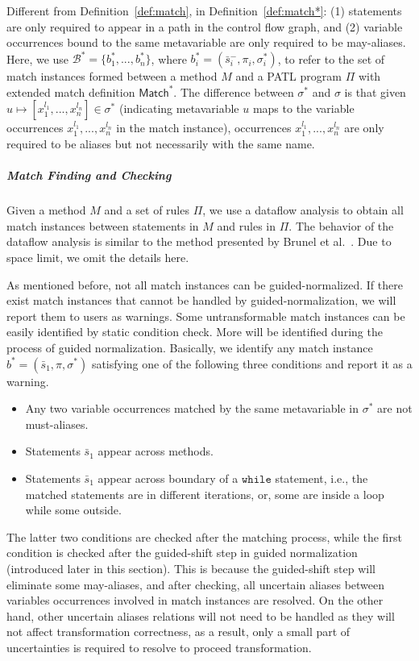 \documentclass[a4paper, USenglish]{lipics-v2016}
\newcommand{\PATL}{PATL\xspace}
\theoremstyle{plain}
\begin{document}
Different from Definition~\ref{def:match}, in Definition~\ref{def:match*}: (1) statements are only required to appear in a path in the control flow graph, and (2) variable occurrences bound to the same metavariable are only required to be may-aliases. Here, we use $\mathcal{B}^*=\{b_1^*,...,b_n^*\}$, where
$b_i^*=(\bar{s}^-_i,\pi_i,\sigma_i^*)$, to refer to the set of match
instances formed between a method $M$ and a \PATL program $\Pi$ with
extended match definition $\mathsf{Match^*}$. The difference between
$\sigma^*$ and $\sigma$ is that given
$u\mapsto[x_1^{l_1},...,x_n^{l_n}]\in\sigma^*$ (indicating
metavariable $u$ maps to the variable occurrences
$x_1^{l_1},...,x_n^{l_n}$ in the match instance), occurrences
$x_1^{l_1},...,x_n^{l_n}$ are only required to be aliases but not
necessarily with the same name.

\subparagraph*{Match Finding and Checking}
Given a method $M$ and a set of rules $\Pi$, we use a dataflow
analysis to obtain all match instances between statements in $M$ and
rules in $\Pi$. The behavior of the dataflow analysis is similar to
the method presented by Brunel et
al.~\cite{DBLP:conf/popl/BrunelDHLM09}. Due to space limit, we
omit the details here.

As mentioned before, not all match instances can be
guided-normalized. If there exist match instances that cannot be
handled by guided-normalization, we will report them to users as
warnings. Some untransformable match instances can be easily identified by
static condition check. More will be identified during the process of
guided normalization.
Basically, we identify any match instance
$b^*=(\bar{s}_1,\pi,\sigma^*)$ satisfying one of the following three
conditions and report it as a warning. 
\begin{itemize}
\item Any two variable occurrences matched by the same metavariable in
  $\sigma^*$ are not must-aliases.
\item Statements $\bar{s}_1$ appear across methods.
\item Statements $\bar{s}_1$ appear across boundary of a
  $\mathtt{while}$ statement, i.e., the matched statements are in
  different iterations, or, some are inside a loop while some outside.
\end{itemize}
The latter two conditions are checked after the matching process,
while the first condition is checked after the guided-shift step in
guided normalization (introduced later in this section). This is
because the guided-shift step will eliminate some may-aliases, and after checking,
all uncertain aliases between variables occurrences involved in match instances are resolved. On the other hand, other uncertain aliases relations will not need to be handled as they will not affect transformation correctness, as a result, only a small part of uncertainties is required to resolve to proceed transformation.
\end{document}
